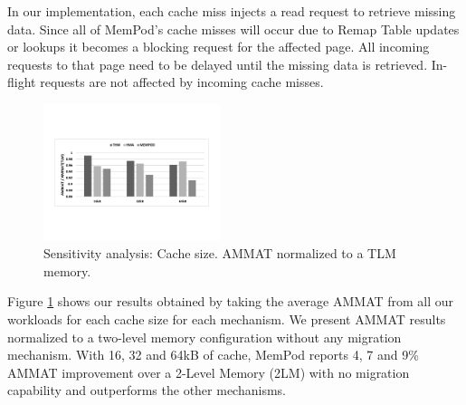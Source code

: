 In our implementation, each cache miss injects a read request to retrieve missing data. Since all of MemPod's cache misses will occur due to Remap Table updates or lookups it becomes a blocking request for the affected page. All incoming requests to that page need to be delayed until the missing data is retrieved. In-flight requests are not affected by incoming cache misses.


\begin{figure}[h]
  \includegraphics[width=0.46\textwidth]{figures/revised/new/cache_norm_tlm.pdf}
  \caption{Sensitivity analysis: Cache size. AMMAT normalized to a TLM memory.}
  \label{fig:cache_norm_tlm}
\end{figure}

Figure \ref{fig:cache_norm_tlm} shows our results obtained by taking the average AMMAT from all our workloads for each cache size for each mechanism. We present AMMAT results normalized to a two-level memory configuration without any migration mechanism. With 16, 32 and 64kB of cache, MemPod reports 4, 7 and 9\% AMMAT improvement over a 2-Level Memory (2LM) with no migration capability and outperforms the other mechanisms.

